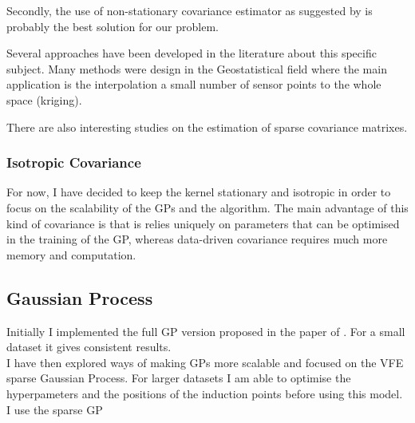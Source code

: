Secondly, the use of non-stationary covariance estimator as suggested by \citet{krause_near-optimal_2008} is probably the best solution for our problem.

Several approaches have been developed in the literature about this specific subject. Many methods were design in the Geostatistical field where the main application is the interpolation a small number of sensor points to the whole space (kriging). 

There are also interesting studies on the estimation of sparse covariance matrixes. \\



%
%



\subsubsection{Isotropic Covariance}

For now, I have decided to keep the kernel stationary and isotropic  in order to focus on the scalability of the GPs and the algorithm. The main advantage of this kind of covariance is that is relies uniquely on parameters that can be optimised in the training of the GP, whereas data-driven covariance requires much more memory and computation. 

\subsection{Gaussian Process}

Initially I implemented the full GP version proposed in the paper of \cite{krause_near-optimal_2008}. For a small dataset it gives consistent results. \\

I have then explored ways of making GPs more scalable and focused on the VFE sparse Gaussian Process. For larger datasets I am able to optimise the hyperpameters and the positions of the induction points before using this model.  \\

I use the sparse GP 









